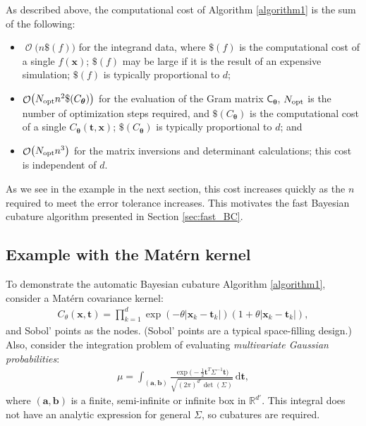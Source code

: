 \documentclass{svjour3}                     %
\DeclareMathOperator{\Order}{{\mathcal O}}
\newcommand{\bm}[1]{\boldsymbol{#1}}
\newcommand{\mSigma}{\mathsf{\Sigma}}
\newcommand{\dif}[1]{\text{d}{#1}}
\newcommand{\reals}{\mathbb{R}}
\newcommand{\vtheta}{{\bm{\theta}}}
\newcommand{\va}{\bm{a}}
\newcommand{\vb}{\bm{b}}
\newcommand{\vt}{\bm{t}}
\newcommand{\vx}{\bm{x}}
\newcommand{\dvt}{\dif{\bm{t}}}
\newcommand{\mC}{\mathsf{C}}
\newcommand{\opt}{{\textup{opt}}}
\begin{document}
As described above, the computational cost of Algorithm \ref{algorithm1} is the sum of the following:
\begin{itemize}
	\item $\Order\bigl(n\$(f) \bigr)$ for the integrand data, where $\$(f)$ is the computational cost of a single $f(\vx)$; $\$(f)$ may be large if it is the result of an expensive simulation; $\$(f)$ is typically proportional to $d$;
	
	\item $\Order\bigl(N_{\opt} n^2 \$(C_\vtheta) \bigr)$ for the evaluation of the Gram matrix $\mC_{\vtheta}$, $N_\opt$ is the number of optimization steps required, and  $\$(C_\vtheta)$ is the computational cost of a single $C_\vtheta(\vt,\vx)$; $\$(C_\vtheta)$ is typically proportional to $d$; and
	
	\item $\Order\bigl(N_{\opt} n^3 \bigr)$ for the matrix inversions and determinant calculations; this cost is independent of $d$.
	
\end{itemize}
As we see in the example in the next section, this cost increases quickly as the $n$ required to meet the error tolerance increases.  This motivates the fast Bayesian cubature algorithm presented in Section \ref{sec:fast_BC}.


\subsection{Example with the Mat\'ern kernel} \label{MVN_example}

To demonstrate the automatic Bayesian cubature Algorithm \ref{algorithm1}, consider a Mat\'ern covariance kernel:
\begin{align*}
C_{\theta}(\vx, \vt) = \prod_{k=1}^d \exp(-\theta|\vx_k-\vt_k|)(1+\theta |\vx_k-\vt_k|),
\end{align*}
and Sobol' points as the nodes.  (Sobol' points are a typical space-filling design.)
Also, consider the integration problem of evaluating  \emph{multivariate Gaussian probabilities}:
\begin{align}
\label{eqn:GaussDef}
\mu = \int_{(\va,\vb)} \frac{\exp\bigl(- \frac 12 \vt^T \mSigma^{-1} \vt \bigr)}{\sqrt{(2 \pi)^{d'} \det(\mSigma)}} \, \dvt,
\end{align}
where $(\va,\vb)$ is a finite, semi-infinite or infinite box in $\reals^{d'}$.  This integral does not have an analytic expression for general $\mSigma$, so cubatures are required.  
\end{document}
